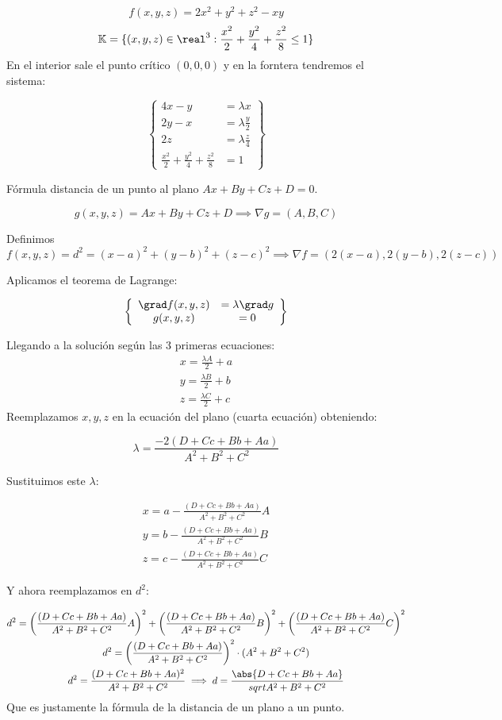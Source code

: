 \begin{problem}[15.b]
\[f(x,y,z) = 2x^2+y^2+z^2-xy\]
\[\mathbb{K} = \{ (x,y,z)\in \real^3 : \frac{x^2}{2} + \frac{y^2}{4} + \frac{z^2}{8} \leq 1\}\]
\solution
En el interior sale el punto crítico $(0,0,0)$ y en la forntera tendremos el sistema:

\[\left\{\begin{array}{cc}
4x-y&=\lambda x\\
2y-x &=\lambda \frac{y}{2}\\
2z &= \lambda\frac{z}{4}\\
\frac{x^2}{2}+\frac{y^2}{4} + \frac{z^2}{8} &=1
\end{array}\right\}\]
\end{problem}


\begin{problem}[18]
Fórmula distancia de un punto al plano $Ax+By+Cz+D=0$.

\solution
\[g(x,y,z) = Ax+By+Cz+D \implies \nabla g = (A,B,C)\]

Definimos 
\[f(x,y,z) = d^2 = (x-a)^2 + (y-b)^2 + (z-c)^2 \implies \nabla f = (2(x-a),2(y-b),2(z-c))\]

Aplicamos el teorema de Lagrange:

\[\left\{\begin{array}{cc}
\grad f(x,y,z) &= \lambda \grad g\\
g(x,y,z)&=0
\end{array}\right\}\]

Llegando a la solución según las 3 primeras ecuaciones:
\begin{gather*}
x=\frac{\lambda A}{2} +a\\
y = \frac{\lambda B}{2} +b\\
z = \frac{\lambda C}{2} +c
\end{gather*}
Reemplazamos $x,y,z$ en la ecuación del plano (cuarta ecuación) obteniendo:

\[\lambda = \frac{-2(D+Cc+Bb+Aa)}{A^2+B^2+C^2}\]

Sustituimos este $\lambda$:

\begin{gather*}
x=a-\frac{(D+Cc+Bb+Aa)}{A^2+B^2+C^2} A \\
y = b- \frac{(D+Cc+Bb+Aa)}{A^2+B^2+C^2} B\\
z = c - \frac{(D+Cc+Bb+Aa)}{A^2+B^2+C^2} C
\end{gather*}

Y ahora reemplazamos en $d^2$:

\begin{gather*}
d^2 = \left(\frac{(D+Cc+Bb+Aa)}{A^2+B^2+C^2} A\right)^2 + \left(\frac{(D+Cc+Bb+Aa)}{A^2+B^2+C^2} B\right)^2 + \left(\frac{(D+Cc+Bb+Aa)}{A^2+B^2+C^2} C\right)^2\\
d^2 = \left(\frac{(D+Cc+Bb+Aa)}{A^2+B^2+C^2}\right)^2 \cdot (A^2+B^2+C^2) \\
d^2 = \frac{(D+Cc+Bb+Aa)^2}{A^2+B^2+C^2} \implies d=\frac{\abs{D+Cc+Bb+Aa}}{sqrt{A^2+B^2+C^2}}
\end{gather*}
Que es justamente la fórmula de la distancia de un plano a un punto.

\end{problem}


